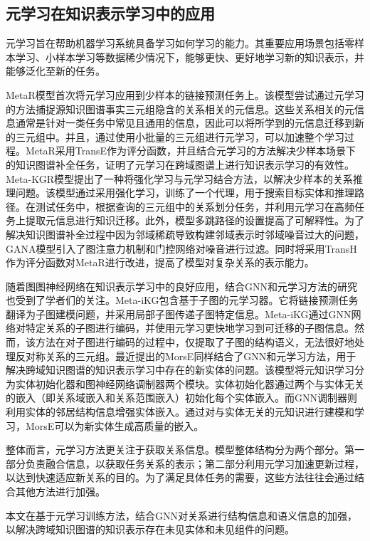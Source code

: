 \subsection{元学习在知识表示学习中的应用}
元学习旨在帮助机器学习系统具备学习如何学习的能力。其重要应用场景包括零样本学习、小样本学习等数据稀少情况下，能够更快、更好地学习新的知识表示，并能够泛化至新的任务。

MetaR\cite{chen2019meta}模型首次将元学习应用到少样本的链接预测任务上。该模型尝试通过元学习的方法捕捉源知识图谱事实三元组隐含的关系相关的元信息。这些关系相关的元信息通常是针对一类任务中常见且通用的信息，因此可以将所学到的元信息迁移到新的三元组中。并且，通过使用小批量的三元组进行元学习，可以加速整个学习过程。MetaR采用TransE作为评分函数，并且结合元学习的方法解决少样本场景下的知识图谱补全任务，证明了元学习在跨域图谱上进行知识表示学习的有效性。Meta-KGR\cite{lv2019adapting}模型提出了一种将强化学习与元学习结合方法，以解决少样本的关系推理问题。该模型通过采用强化学习，训练了一个代理，用于搜索目标实体和推理路径。在测试任务中，根据查询的三元组中的关系划分任务，并利用元学习在高频任务上提取元信息进行知识迁移。此外，模型多跳路径的设置提高了可解释性。为了解决知识图谱补全过程中因为邻域稀疏导致构建邻域表示时邻域噪音过大的问题，GANA\cite{niu2021relational}模型引入了图注意力机制和门控网络对噪音进行过滤。同时将采用TransH作为评分函数对MetaR进行改进，提高了模型对复杂关系的表示能力。

随着图图神经网络在知识表示学习中的良好应用，结合GNN和元学习方法的研究也受到了学者们的关注。Meta-iKG\cite{zheng2022subgraph}包含基于子图的元学习器。它将链接预测任务翻译为子图建模问题，并采用局部子图传递子图特定信息。Meta-iKG通过GNN网络对特定关系的子图进行编码，并使用元学习更快地学习到可迁移的子图信息。然而，该方法在对子图进行编码的过程中，仅提取了子图的结构语义，无法很好地处理反对称关系的三元组。最近提出的MorsE\cite{chen2022meta}同样结合了GNN和元学习方法，用于解决跨域知识图谱的知识表示学习中存在的新实体的问题。该模型将元知识学习分为实体初始化器和图神经网络调制器两个模块。实体初始化器通过两个与实体无关的嵌入（即关系域嵌入和关系范围嵌入）初始化每个实体嵌入。而GNN调制器则利用实体的邻居结构信息增强实体嵌入。通过对与实体无关的元知识进行建模和学习，MorsE可以为新实体生成高质量的嵌入。

整体而言，元学习方法更关注于获取关系信息。模型整体结构分为两个部分。第一部分负责融合信息，以获取任务关系的表示；第二部分利用元学习加速更新过程，以达到快速适应新关系的目的。为了满足具体任务的需要，这些方法往往会通过结合其他方法进行加强。

本文在基于元学习训练方法，结合GNN对关系进行结构信息和语义信息的加强，以解决跨域知识图谱的知识表示存在未见实体和未见组件的问题。

